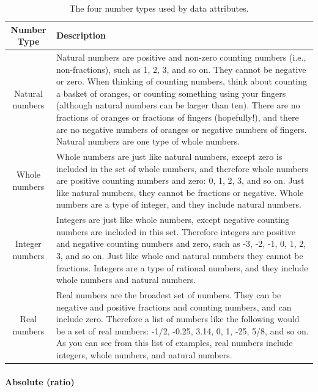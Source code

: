 \begin{table}[htbp]
  \centering
  \begin{tabular}{|c|m{}|}
  \hline
  \textbf{Number Type} & \textbf{Description} \\
  \hline
  Natural numbers &
    Natural numbers are positive and non-zero counting numbers (i.e.,
    non-fractions), such as 1, 2, 3, and so on. They cannot be negative
    or zero. When thinking of counting numbers, think about counting a
    basket of oranges, or counting something using your fingers
    (although natural numbers can be larger than ten). There are no
    fractions of oranges or fractions of fingers (hopefully!), and there
    are no negative numbers of oranges or negative numbers of fingers.
    Natural numbers are one type of whole numbers. \\
  \hline
  Whole numbers &
    Whole numbers are just like natural numbers, except zero is included
    in the set of whole numbers, and therefore whole numbers are
    positive counting numbers and zero: 0, 1, 2, 3, and so on. Just like
    natural numbers, they cannot be fractions or negative. Whole numbers
    are a type of integer, and they include natural numbers. \\
  \hline
  Integer numbers &
    Integers are just like whole numbers, except negative counting
    numbers are included in this set. Therefore integers are positive
    and negative counting numbers and zero, such as -3, -2, -1, 0, 1, 2,
    3, and so on. Just like whole and natural numbers they cannot be
    fractions. Integers are a type of rational numbers, and they include
    whole numbers and natural numbers. \\
  \hline
  Real numbers &
    Real numbers are the broadest set of numbers. They can be negative
    and positive fractions and counting numbers, and can include zero.
    Therefore a list of numbers like the following would be a set of
    real numbers: -1/2, -0.25, 3.14, 0, 1, -25, 5/8, and so on. As you
    can see from this list of examples, real numbers include integers,
    whole numbers, and natural numbers. \\
  \hline
  \end{tabular}
  \caption{The four number types used by data attributes.}
  \label{tab:number-types}
\end{table}

\paragraph{Absolute (ratio)} \label{par:cat-absolute}

